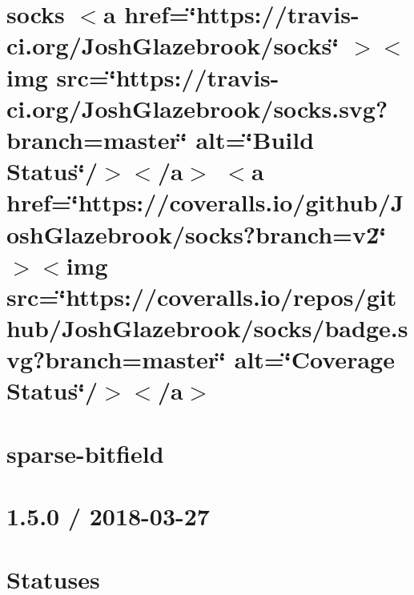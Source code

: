 \documentclass[twoside]{book}
\newcommand{\+}{\discretionary{\mbox{\scriptsize$\hookleftarrow$}}{}{}}
\begin{document}
\chapter{socks \texorpdfstring{$<$}{<}a href=\char`\"{}https\+://travis-\/ci.\+org/\+Josh\+Glazebrook/socks\char`\"{} \texorpdfstring{$>$}{>}\texorpdfstring{$<$}{<}img src=\char`\"{}https\+://travis-\/ci.\+org/\+Josh\+Glazebrook/socks.\+svg?branch=master\char`\"{} alt=\char`\"{}\+Build Status\char`\"{}/\texorpdfstring{$>$}{>}\texorpdfstring{$<$}{<}/a\texorpdfstring{$>$}{>} \texorpdfstring{$<$}{<}a href=\char`\"{}https\+://coveralls.\+io/github/\+Josh\+Glazebrook/socks?branch=v2\char`\"{} \texorpdfstring{$>$}{>}\texorpdfstring{$<$}{<}img src=\char`\"{}https\+://coveralls.\+io/repos/github/\+Josh\+Glazebrook/socks/badge.\+svg?branch=master\char`\"{} alt=\char`\"{}\+Coverage Status\char`\"{}/\texorpdfstring{$>$}{>}\texorpdfstring{$<$}{<}/a\texorpdfstring{$>$}{>}}
\label{md__c___users_vaishnavi_jadhav__desktop__developer_code_mean_stack_example_server_node_modules_socks__r_e_a_d_m_e}

\chapter{sparse-\/bitfield}
\label{md__c___users_vaishnavi_jadhav__desktop__developer_code_mean_stack_example_server_node_modules_sparse_bitfield__r_e_a_d_m_e}

\chapter{1.5.0 / 2018-\/03-\/27}
\label{md__c___users_vaishnavi_jadhav__desktop__developer_code_mean_stack_example_server_node_modules_statuses__h_i_s_t_o_r_y}

\chapter{Statuses}
\label{md__c___users_vaishnavi_jadhav__desktop__developer_code_mean_stack_example_server_node_modules_statuses__r_e_a_d_m_e}

\end{document}
